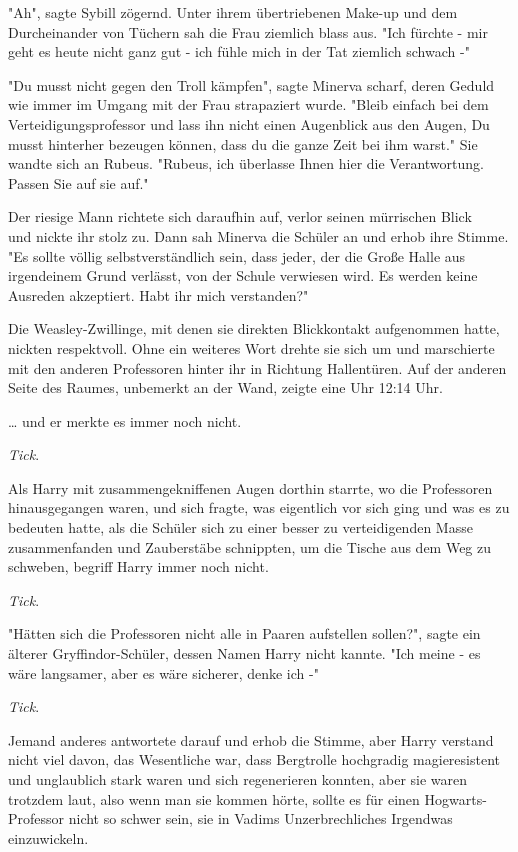 {"Ah", sagte Sybill zögernd. Unter ihrem übertriebenen Make-up und dem Durcheinander von Tüchern sah die Frau ziemlich blass aus. "Ich fürchte - mir geht es heute nicht ganz gut - ich fühle mich in der Tat ziemlich schwach -"

"Du musst nicht gegen den Troll kämpfen", sagte Minerva scharf, deren Geduld wie immer im Umgang mit der Frau strapaziert wurde. "Bleib einfach bei dem Verteidigungsprofessor und lass ihn nicht einen Augenblick aus den Augen, Du musst hinterher bezeugen können, dass du die ganze Zeit bei ihm warst." Sie wandte sich an Rubeus. "Rubeus, ich überlasse Ihnen hier die Verantwortung. Passen Sie auf sie auf."

Der riesige Mann richtete sich daraufhin auf, verlor seinen mürrischen Blick\\ und nickte ihr stolz zu. Dann sah Minerva die Schüler an und erhob ihre Stimme. "Es sollte völlig selbstverständlich sein, dass jeder, der die Große Halle aus irgendeinem Grund verlässt, von der Schule verwiesen wird. Es werden keine Ausreden akzeptiert. Habt ihr mich verstanden?"

Die Weasley-Zwillinge, mit denen sie direkten Blickkontakt aufgenommen hatte, nickten respektvoll. Ohne ein weiteres Wort drehte sie sich um und marschierte mit den anderen Professoren hinter ihr in Richtung Hallentüren. Auf der anderen Seite des Raumes, unbemerkt an der Wand, zeigte eine Uhr 12:14 Uhr.

… und er merkte es immer noch nicht.

\emph{Tick}.

Als Harry mit zusammengekniffenen Augen dorthin starrte, wo die Professoren hinausgegangen waren, und sich fragte, was eigentlich vor sich ging und was es zu bedeuten hatte, als die Schüler sich zu einer besser zu verteidigenden Masse zusammenfanden und Zauberstäbe schnippten, um die Tische aus dem Weg zu schweben, begriff Harry immer noch nicht.

\emph{Tick}.

"Hätten sich die Professoren nicht alle in Paaren aufstellen sollen?", sagte ein älterer Gryffindor-Schüler, dessen Namen Harry nicht kannte. "Ich meine - es wäre langsamer, aber es wäre sicherer, denke ich -"

\emph{Tick}.

Jemand anderes antwortete darauf und erhob die Stimme, aber Harry verstand nicht viel davon, das Wesentliche war, dass Bergtrolle hochgradig magieresistent und unglaublich stark waren und sich regenerieren konnten, aber sie waren trotzdem laut, also wenn man sie kommen hörte, sollte es für einen Hogwarts-Professor nicht so schwer sein, sie in Vadims Unzerbrechliches Irgendwas einzuwickeln.

}
